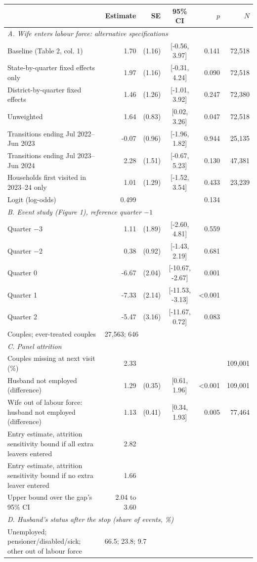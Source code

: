 \begin{tabular}{lrrcrr}
\toprule
 & Estimate & SE & 95\% CI & $p$ & $N$ \\
\midrule
\multicolumn{6}{l}{\textit{A. Wife enters labour force: alternative specifications}} \\
Baseline (Table 2, col. 1) & 1.70 & (1.16) & [-0.56, 3.97] & 0.141 & 72,518 \\
State-by-quarter fixed effects only & 1.97 & (1.16) & [-0.31, 4.24] & 0.090 & 72,518 \\
District-by-quarter fixed effects & 1.46 & (1.26) & [-1.01, 3.92] & 0.247 & 72,380 \\
Unweighted & 1.64 & (0.83) & [0.02, 3.26] & 0.047 & 72,518 \\
Transitions ending Jul 2022--Jun 2023 & -0.07 & (0.96) & [-1.96, 1.82] & 0.944 & 25,135 \\
Transitions ending Jul 2023--Jun 2024 & 2.28 & (1.51) & [-0.67, 5.23] & 0.130 & 47,381 \\
Households first visited in 2023--24 only & 1.01 & (1.29) & [-1.52, 3.54] & 0.433 & 23,239 \\
Logit (log-odds) & 0.499 & & & 0.134 & \\
\multicolumn{6}{l}{\textit{B. Event study (Figure 1), reference quarter $-1$}} \\
\quad Quarter $-$3 & 1.11 & (1.89) & [-2.60, 4.81] & 0.559 & \\
\quad Quarter $-$2 & 0.38 & (0.92) & [-1.43, 2.19] & 0.681 & \\
\quad Quarter 0 & -6.67 & (2.04) & [-10.67, -2.67] & 0.001 & \\
\quad Quarter 1 & -7.33 & (2.14) & [-11.53, -3.13] & <0.001 & \\
\quad Quarter 2 & -5.47 & (3.16) & [-11.67, 0.72] & 0.083 & \\
\quad Couples; ever-treated couples & \multicolumn{5}{l}{27,563; 646} \\
\multicolumn{6}{l}{\textit{C. Panel attrition}} \\
\quad Couples missing at next visit (\%) & 2.33 & & & & 109,001 \\
\quad Husband not employed (difference) & 1.29 & (0.35) & [0.61, 1.96] & <0.001 & 109,001 \\
\quad Wife out of labour force: husband not employed (difference) & 1.13 & (0.41) & [0.34, 1.93] & 0.005 & 77,464 \\
\quad Entry estimate, attrition sensitivity bound if all extra leavers entered & 2.82 & & & & \\
\quad Entry estimate, attrition sensitivity bound if no extra leaver entered & 1.66 & & & & \\
\quad Upper bound over the gap's 95\% CI & 2.04 to 3.60 & & & & \\
\multicolumn{6}{l}{\textit{D. Husband's status after the stop (share of events, \%)}} \\
\quad Unemployed; pensioner/disabled/sick; other out of labour force & \multicolumn{5}{l}{66.5; 23.8; 9.7} \\
\bottomrule
\end{tabular}
